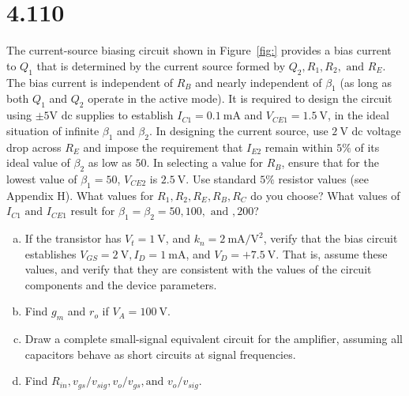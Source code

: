 \documentclass[12pt, a4paper]{article}
\begin{document}
\section{4.110}
The current-source biasing circuit shown in Figure~\ref{fig:} provides a bias current to $Q_1$ that is determined by the current source formed by $Q_2, R_1, R_2, \text{ and } R_E$. The bias current is independent of $R_B$ and nearly independent of $\beta_1$ (as long as both $Q_1$ and $Q_2$ operate in the active mode). It is required to design the circuit using $\pm 5 \si{\V}$ dc supplies to establish $I_{C1} = \SI{0.1}{\mA}$ and $V_{CE1} = \SI{1.5}{\V}$, in the ideal situation of infinite $\beta_1$ and $\beta_2$. In designing the current source, use $\SI{2}{\V}$ dc voltage drop across $R_E$ and impose the requirement that $I_{E2}$ remain within $5\%$ of its ideal value of $\beta_2$ as low as $50$. In selecting a value for $R_B$, ensure that for the lowest value of $\beta_1 = 50$, $V_{CE2}$ is $\SI{2.5}{\V}$. Use standard $5 \%$ resistor values (see Appendix H). What values for $R_1, R_2, R_E, R_B, R_C$ do you choose? What values of $I_{C1} \text{ and } I_{CE1}$ result for $\beta_1 = \beta_2 = 50, 100, \text{ and } , 200$?

\begin{enumerate}[(a)]
  \item If the transistor has $V_t = \SI{1}{\V}$, and $k_n = \SI{2}{\mA\per\V\squared}$, verify that the bias circuit establishes $V_{GS} = \SI{2}{\V}, I_D = \SI{1}{\mA}$, and $V_D = + \SI{7.5}{\V}$. That is, assume these values, and verify that they are consistent with the values of the circuit components and the device parameters.
  \item Find $g_m$ and $r_o$ if $V_A = \SI{100}{\V}$.
  \item Draw a complete small-signal equivalent circuit for the amplifier, assuming all capacitors behave as short circuits at signal frequencies.
  \item Find $R_{in}, v_{gs}/v_{sig}, v_o/v_{gs}, \text{and } v_o/v_{sig}$.
\end{enumerate}
\end{document}
